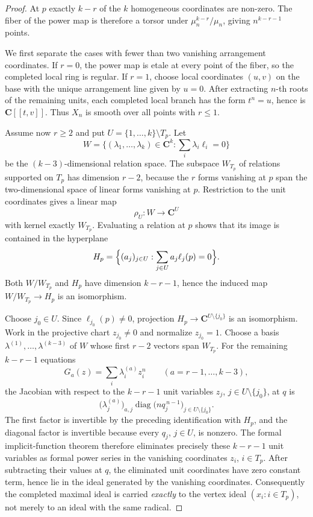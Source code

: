 \documentclass[10pt,a4paper]{amsart}
\newcommand{\CC}{\mathbf C}
\begin{document}
\begin{proof}
At $p$ exactly $k-r$ of the $k$ homogeneous coordinates are non-zero.  The
fiber of the power map is therefore a torsor under
$\mu_n^{k-r}/\mu_n$, giving $n^{k-r-1}$ points.

We first separate the cases with fewer than two vanishing arrangement coordinates.
If $r=0$, the power map is etale at every point of the fiber, so the completed
local ring is regular.  If $r=1$, choose local coordinates $(u,v)$ on the base
with the unique arrangement line given by $u=0$.  After extracting $n$-th roots
of the remaining units, each completed local branch has the form $t^n=u$, hence
is $\CC[[t,v]]$.  Thus $X_n$ is smooth over all points with $r\le1$.

Assume now $r\ge2$ and put $U=\{1,\ldots,k\}\setminus T_p$.
Let
\[
 W=\{(\lambda_1,\ldots,\lambda_k)\in\CC^k:
       \textstyle\sum_i\lambda_i\ell_i=0\}
\]
be the $(k-3)$-dimensional relation space.  The subspace $W_{T_p}$ of relations
supported on $T_p$ has dimension $r-2$, because the $r$ forms vanishing at $p$
span the two-dimensional space of linear forms vanishing at $p$.  Restriction
to the unit coordinates gives a linear map
\[
        \rho_U:W\longrightarrow\CC^U
\]
with kernel exactly $W_{T_p}$.  Evaluating a relation at $p$ shows that its image is
contained in the hyperplane
\[
 H_p=\Bigl\{(a_j)_{j\in U}:\sum_{j\in U}a_j\ell_j(p)=0\Bigr\}.
\]
Both $W/W_{T_p}$ and $H_p$ have dimension $k-r-1$, hence the induced map
$W/W_{T_p}\to H_p$ is an isomorphism.

Choose $j_0\in U$.  Since $\ell_{j_0}(p)\ne0$, projection
$H_p\to\CC^{U\setminus\{j_0\}}$ is an isomorphism.  Work in the projective
chart $z_{j_0}\ne0$ and normalize $z_{j_0}=1$.  Choose a basis
$\lambda^{(1)},\ldots,\lambda^{(k-3)}$ of $W$ whose first $r-2$ vectors span
$W_{T_p}$.  For the remaining $k-r-1$ equations
\[
        G_a(z)=\sum_i\lambda_i^{(a)}z_i^n \qquad (a=r-1,\ldots,k-3),
\]
the Jacobian with respect to the $k-r-1$ unit variables
$z_j$, $j\in U\setminus\{j_0\}$, at $q$ is
\[
 \bigl(\lambda_j^{(a)}\bigr)_{a,j}
 \operatorname{diag}\bigl(nq_j^{\,n-1}\bigr)_{j\in U\setminus\{j_0\}}.
\]
The first factor is invertible by the preceding identification with $H_p$, and
the diagonal factor is invertible because every $q_j$, $j\in U$, is nonzero.
The formal implicit-function theorem therefore eliminates precisely these
$k-r-1$ unit variables as formal power series in the vanishing coordinates
$z_i$, $i\in T_p$.  After subtracting their values at $q$, the eliminated unit
coordinates have zero constant term, hence lie in the ideal generated by the
vanishing coordinates.  Consequently the completed maximal ideal is carried
\emph{exactly} to the vertex ideal $(x_i:i\in T_p)$, not merely to an ideal with
the same radical.


\end{proof}
\end{document}
